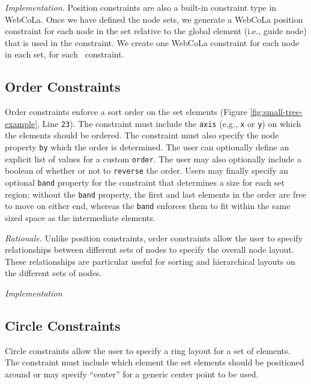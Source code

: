 \emph{Implementation.}
Position constraints are also a built-in constraint type in WebCoLa.
Once we have defined the node sets, we generate a WebCoLa position constraint
for each node in the set relative to the global element (i.e., guide node)
that is used in the constraint. We create one WebCoLa constraint for each node
in each set, for each \projectname\ constraint.


\subsection{Order Constraints}
 Order constraints enforce a sort order on the set
elements (Figure \ref{fig:small-tree-example}, Line \texttt{23}). The
constraint must include the \texttt{axis} (e.g., \texttt{x} or \texttt{y})
on which the elements should be ordered. The constraint must also specify
the node property \texttt{by} which the order is determined. The user can
optionally define an explicit list of values for a custom
\texttt{order}. The user may also optionally include a boolean of whether
or not to \texttt{reverse} the order. Users may finally specify an optional
\texttt{band} property for the constraint that determines a size for each
set region; without the \texttt{band} property, the first and last elements
in the order are free to move on either end, whereas the \texttt{band}
enforces them to fit within the same sized space as the intermediate
elements. 


\emph{Rationale.} Unlike position constraints, order constraints allow the
user to specify relationships between different sets of nodes to specify
the overall node layout. These relationships are particular useful for
sorting and hierarchical layouts on the different sets of nodes.

\emph{Implementation}

\subsection{Circle Constraints}
 Circle
constraints allow the user to specify a ring layout for a set of
elements. The constraint must include which element the set elements should
be positioned around or may specify ``center'' for a generic center point
to be used.

